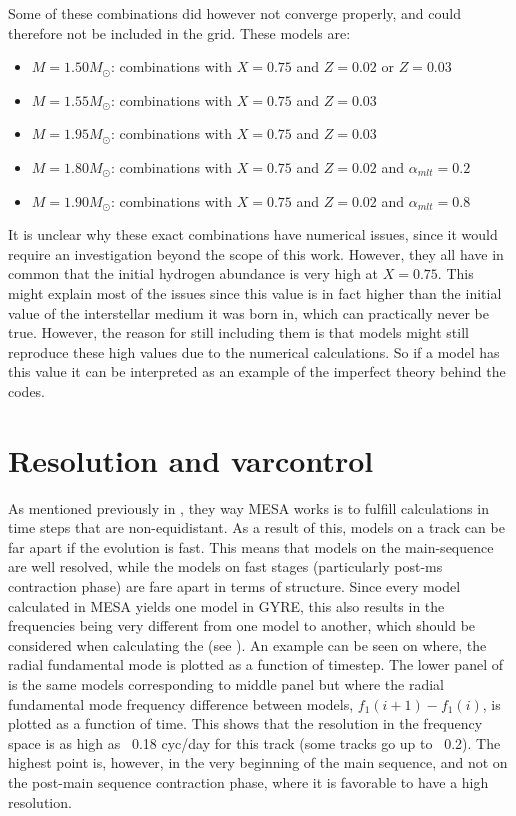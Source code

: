 Some of these combinations did however not converge properly, and could therefore not be included in the grid. These models are:
\begin{itemize}
	\item $M=1.50M_\odot$: combinations with $X=0.75$ and $Z=0.02$ or $Z=0.03$
	\item $M=1.55M_\odot$: combinations with $X=0.75$ and $Z=0.03$
	\item $M=1.95M_\odot$: combinations with $X=0.75$ and $Z=0.03$
	\item $M=1.80M_\odot$: combinations with $X=0.75$ and $Z=0.02$ and $\alpha_{mlt} = 0.2$
	\item $M=1.90M_\odot$: combinations with $X=0.75$ and $Z=0.02$ and $\alpha_{mlt} = 0.8$ 
\end{itemize}

It is unclear why these exact combinations have numerical issues, since it would require an investigation beyond the scope of this work. However, they all have in common that the initial hydrogen abundance is very high at $X=0.75$. This might explain most of the issues since this value is in fact higher than the initial value of the interstellar medium it was born in, which can practically never be true. However, the reason for still including them is that models might still reproduce these high values due to the numerical calculations. So if a model has this value it can be interpreted as an example of the imperfect theory behind the codes.  

\section{Resolution and varcontrol}
\label{sec:res}

As mentioned previously in , they way MESA works is to fulfill calculations in time steps that are non-equidistant. As a result of this, models on a track can be far apart if the evolution is fast. This means that models on the main-sequence are well resolved, while the models on fast stages (particularly post-ms contraction phase) are fare apart in terms of structure. Since every model calculated in MESA yields one model in GYRE, this also results in the frequencies being very different from one model to another, which should be considered when calculating the \chis (see ). An example can be seen on  where, the radial fundamental mode is plotted as a function of timestep. The lower panel of  is the same models corresponding to middle panel but where the radial fundamental mode frequency difference between models, $f_1(i+1) - f_1(i)$, is plotted as a function of time. This shows that the resolution in the frequency space is as high as ~0.18 cyc/day for this track (some tracks go up to ~0.2). The highest point is, however, in the very beginning of the main sequence, and not on the post-main sequence contraction phase, where it is favorable to have a high resolution.     

